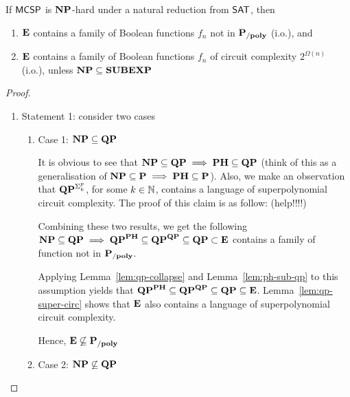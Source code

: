 \documentclass[12pt]{article}
\theoremstyle{definition}
\begin{document}
\begin{theorem}[Theorem 15]
If $\mathsf{MCSP}$ is $\mathbf{NP}$-hard under a natural reduction from $\mathsf{SAT}$, then
\begin{enumerate} [1.]
	\item $\mathbf{E}$ contains a family of Boolean functions $f_n$ not in $\mathbf{P_{/poly}}$ (i.o.), and
	\item $\mathbf{E}$ contains a family of Boolean functions $f_n$ of circuit complexity $2^{\Omega(n)}$ (i.o.), unless $\mathbf{NP} \subseteq \mathbf{SUBEXP}$
\end{enumerate}
\end{theorem}

\begin{proof}
\begin{enumerate}[-]
	\item Statement 1: consider two cases
	\begin{enumerate} [+]
		\item Case 1: $\mathbf{NP} \subseteq \mathbf{QP}$
		
      {\color{gray}
      It is obvious to see that $\mathbf{NP} \subseteq \mathbf{QP} \implies \mathbf{PH} \subseteq \mathbf{QP}$ (think of this as a generalisation of $\mathbf{NP} \subseteq \mathbf{P} \implies \mathbf{PH} \subseteq \mathbf{P}$). Also, we make an observation that $\mathbf{QP}^{\Sigma_k^p}$, for some $k \in {\mathbb{N}}$, contains a language of superpolynomial circuit complexity. The proof of this claim is as follow: (help!!!!)
		
		Combining these two results, we get the following $\mathbf{NP} \subseteq \mathbf{QP} \implies \mathbf{QP}^{\mathbf{PH}} \subseteq \mathbf{QP}^{\mathbf{QP}} \subseteq \mathbf{QP} \subset \mathbf{E}$ contains a family of function not in $\mathbf{P_{/poly}}$.}

      Applying Lemma~\ref{lem:qp-collapse} and Lemma~\ref{lem:ph-sub-qp} to this assumption yields that
      $\mathbf{QP}^{\mathbf{PH}} \subseteq \mathbf{QP}^{\mathbf{QP}} \subseteq
       \mathbf{QP} \subseteq \mathbf{E}$.
      Lemma~\ref{lem:qp-super-circ} shows that $\mathbf{E}$ also contains
      a language of superpolynomial circuit complexity.

		
		Hence, $\mathbf{E} \not\subseteq \mathbf{P_{/poly}}$\\
		
		\item Case 2: $\mathbf{NP} \not\subseteq \mathbf{QP}$
		

\end{enumerate}
\end{enumerate}
\end{proof}
\end{document}
